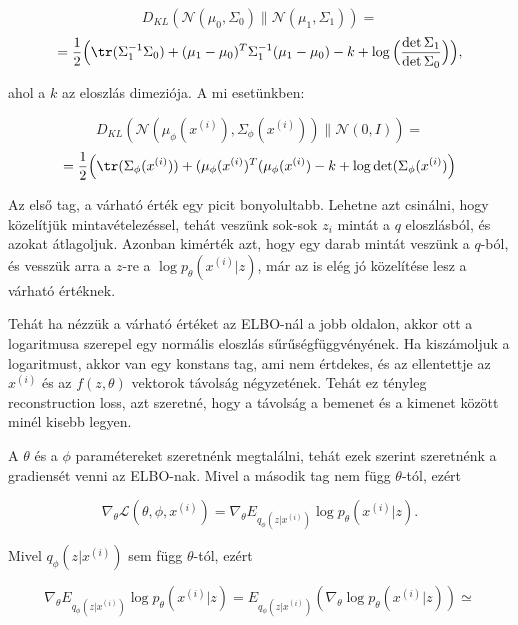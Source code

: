 \documentclass[12pt]{amsart}
\begin{document}
\[
    D_{KL}(\mathcal{N}(\mu_0, \Sigma_0)\| \mathcal{N}(\mu_1,
    \Sigma_1)) =
\]
\[
    = \frac{1}{2}\Big(\tr (\Sigma_1^{-1}\Sigma_0)+
    (\mu_1-\mu_0)^T \Sigma_1^{-1}(\mu_1-\mu_0)-k +\log
    \Big(\frac{\det \Sigma_1}{\det \Sigma_0}\Big)\Big),
\]  

\vspace{5pt}

ahol a $k$ az eloszlás dimeziója. A mi esetünkben:

\[
  D_{KL}(\mathcal{N}(\mu_\phi(x^{(i)}),
  \Sigma_\phi(x^{(i)}))\| \mathcal{N}(0,I)) =
\]
\[
  = \frac{1}{2}\Big(\tr (\Sigma_\phi(x^{(i)}))+
  (\mu_\phi(x^{(i)})^T (\mu_\phi(x^{(i)})-k +\log
  \det(\Sigma_\phi(x^{(i)})\Big)
\]

\vspace{5pt}

Az első tag, a várható érték egy picit bonyolultabb. Lehetne
azt csinálni, hogy közelítjük mintavételezéssel, tehát
veszünk sok-sok $z_i$ mintát a $q$ eloszlásból, és azokat
átlagoljuk. Azonban kimérték azt, hogy egy darab mintát
veszünk a $q$-ból, és vesszük arra a $z$-re a
$\log p_{\theta}(x^{(i)}| z)$, már az is elég jó közelítése
lesz a várható értéknek.

\vspace{5pt}

Tehát ha nézzük a várható értéket az ELBO-nál a jobb
oldalon, akkor ott a logaritmusa szerepel egy normális
eloszlás sűrűségfüggvényének. Ha kiszámoljuk a logaritmust,
akkor van egy konstans tag, ami nem értdekes, és az
ellentettje az $x^{(i)}$ és az $f(z, \theta)$ vektorok
távolság négyzetének. Tehát ez tényleg reconstruction loss,
azt szeretné, hogy a távolság a bemenet és a kimenet között
minél kisebb legyen. 

\vspace{5pt}

A $\theta$ és a $\phi$ paramétereket szeretnénk megtalálni,
tehát ezek szerint szeretnénk a gradiensét venni az
ELBO-nak. Mivel a második tag nem függ $\theta$-tól, ezért

\[
  \nabla_\theta \mathcal{L}(\theta, \phi, x^{(i)}) =
  \nabla_\theta E_{q_{\phi}(z| x^{(i)})}\log
  p_{\theta}(x^{(i)}| z). 
\]

\vspace{5pt}

Mivel $q_{\phi}(z| x^{(i)})$ sem függ $\theta$-tól, ezért

\[
  \nabla_\theta E_{q_{\phi}(z| x^{(i)})}\log
  p_{\theta}(x^{(i)}| z) = E_{q_{\phi}(z|
    x^{(i)})}(\nabla_\theta \log p_{\theta}(x^{(i)}| z))\simeq
\]
\end{document}
